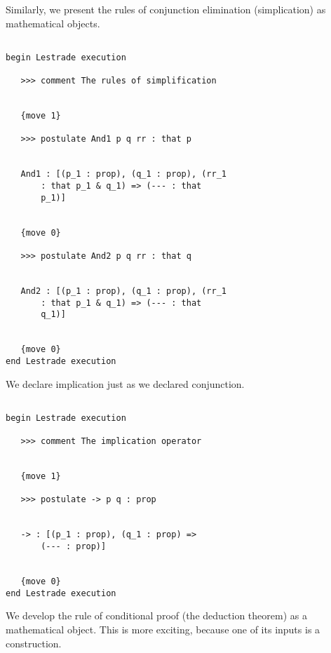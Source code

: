 \documentclass[12pt]{article}
\begin{document}
Similarly, we present the rules of conjunction elimination (simplication) as mathematical objects.

\begin{verbatim}

begin Lestrade execution

   >>> comment The rules of simplification


   {move 1}

   >>> postulate And1 p q rr : that p


   And1 : [(p_1 : prop), (q_1 : prop), (rr_1 
       : that p_1 & q_1) => (--- : that 
       p_1)]


   {move 0}

   >>> postulate And2 p q rr : that q


   And2 : [(p_1 : prop), (q_1 : prop), (rr_1 
       : that p_1 & q_1) => (--- : that 
       q_1)]


   {move 0}
end Lestrade execution
\end{verbatim}

We declare implication just as we declared conjunction.

\begin{verbatim}

begin Lestrade execution

   >>> comment The implication operator


   {move 1}

   >>> postulate -> p q : prop


   -> : [(p_1 : prop), (q_1 : prop) => 
       (--- : prop)]


   {move 0}
end Lestrade execution
\end{verbatim}

We develop the rule of conditional proof (the deduction theorem) as a mathematical object.  This is more exciting, because one of its inputs is a construction.
\end{document}
